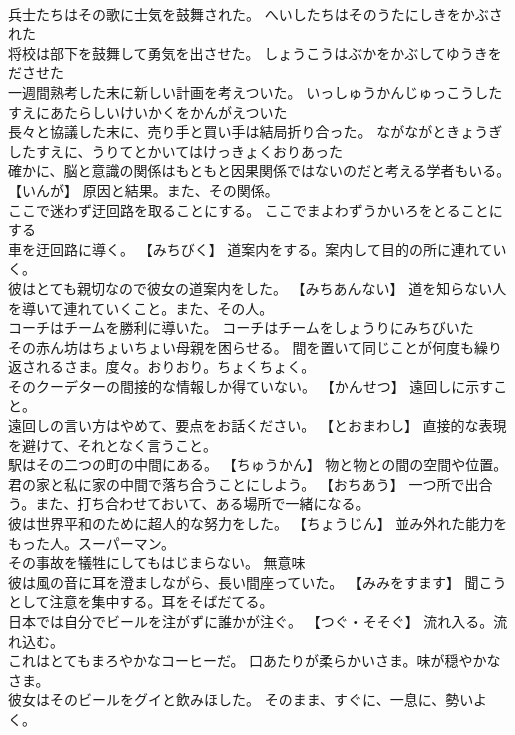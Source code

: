 \documentclass[8pt]{extreport}
\begin{document}
\begin{CJK}{UTF8}{min}
\\	兵士たちはその歌に士気を鼓舞された。	へいしたちはそのうたにしきをかぶされた 
\\	将校は部下を鼓舞して勇気を出させた。	しょうこうはぶかをかぶしてゆうきをださせた 
\\	一週間熟考した末に新しい計画を考えついた。	いっしゅうかんじゅっこうしたすえにあたらしいけいかくをかんがえついた 
\\	長々と協議した末に、売り手と買い手は結局折り合った。	ながながときょうぎしたすえに、うりてとかいてはけっきょくおりあった 
\\	確かに、脳と意識の関係はもともと因果関係ではないのだと考える学者もいる。	【いんが】 原因と結果。また、その関係。
\\	ここで迷わず迂回路を取ることにする。	ここでまよわずうかいろをとることにする 
\\	車を迂回路に導く。	【みちびく】 道案内をする。案内して目的の所に連れていく。
\\	彼はとても親切なので彼女の道案内をした。	【みちあんない】 道を知らない人を導いて連れていくこと。また、その人。
\\	コーチはチームを勝利に導いた。	コーチはチームをしょうりにみちびいた 
\\	その赤ん坊はちょいちょい母親を困らせる。	間を置いて同じことが何度も繰り返されるさま。度々。おりおり。ちょくちょく。
\\	そのクーデターの間接的な情報しか得ていない。	【かんせつ】 遠回しに示すこと。
\\	遠回しの言い方はやめて、要点をお話ください。	【とおまわし】 直接的な表現を避けて、それとなく言うこと。
\\	駅はその二つの町の中間にある。	【ちゅうかん】 物と物との間の空間や位置。
\\	君の家と私に家の中間で落ち合うことにしよう。	【おちあう】 一つ所で出合う。また、打ち合わせておいて、ある場所で一緒になる。
\\	彼は世界平和のために超人的な努力をした。	【ちょうじん】 並み外れた能力をもった人。スーパーマン。
\\	その事故を犠牲にしてもはじまらない。	無意味
\\	彼は風の音に耳を澄ましながら、長い間座っていた。	【みみをすます】 聞こうとして注意を集中する。耳をそばだてる。
\\	日本では自分でビールを注がずに誰かが注ぐ。	【つぐ・そそぐ】 流れ入る。流れ込む。
\\	これはとてもまろやかなコーヒーだ。	口あたりが柔らかいさま。味が穏やかなさま。
\\	彼女はそのビールをグイと飲みほした。	そのまま、すぐに、一息に、勢いよく。

\end{CJK}
\end{document}
